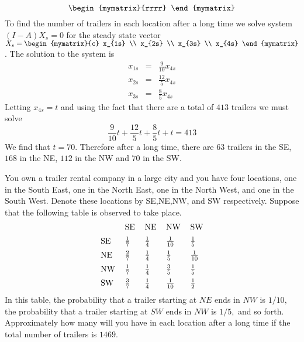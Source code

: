 \begin{enumialphparenastyle}
\begin{ex}
\begin{sol}
\[\begin{mymatrix}{rrrr}
\end{mymatrix}
\]
To find the number of trailers in each location after a long time we solve system $(I - A)X_s = 0$ for the steady state vector $X_s = \begin{mymatrix}{c}
x_{1s} \\
x_{2s} \\
x_{3s} \\
x_{4s} 
\end{mymatrix}$. 
The solution to the system is 
\begin{eqnarray*}
x_{1s} &=& \frac{9}{10} x_{4s} \\
x_{2s} &=& \frac{12}{5} x_{4s} \\
x_{3s} &=& \frac{8}{5} x_{4s} 
\end{eqnarray*}
Letting $x_{4s} = t$ and using the fact that there are a total of $413$ trailers we must solve
\[
\frac{9}{10} t + \frac{12}{5} t + \frac{8}{5}t  + t = 413
\]
We find that $t=70$. Therefore after a long time, there are $63$ trailers in the SE, $168$ in the NE, $112$ in the NW and $70$ in the SW.  
\end{sol}
\end{ex}

\begin{ex} You own a trailer rental company in a large city and you have four
locations, one in the South East, one in the North East, one in the North
West, and one in the South West. Denote these locations by SE,NE,NW, and SW
respectively. Suppose that the following table is observed to take place.
\begin{equation*}
\begin{tabular}{lllll}
& SE & NE & NW & SW \\[0.5em]
SE & $\frac{1}{7}$ & $\frac{1}{4}$ & $\frac{1}{10}$ & $\frac{1}{5}$ \\[0.5em]
NE & $\frac{2}{7}$ & $\frac{1}{4}$ & $\frac{1}{5}$ & $\frac{1}{10}$ \\[0.5em]
NW & $\frac{1}{7}$ & $\frac{1}{4}$ & $\frac{3}{5}$ & $\frac{1}{5}$ \\[0.5em]
SW & $\frac{3}{7}$ & $\frac{1}{4}$ & $\frac{1}{10}$ & $\frac{1}{2}$ \\
\end{tabular}
\end{equation*}
In this table, the probability that a trailer starting at $NE$ ends in $NW$
is $1/10,$ the probability that a trailer starting at $SW$ ends in $NW$ is 
$1/5,$ and so forth. Approximately how many will you have in each location
after a long time if the total number of trailers is $1469.$
\end{ex}


\end{enumialphparenastyle}
